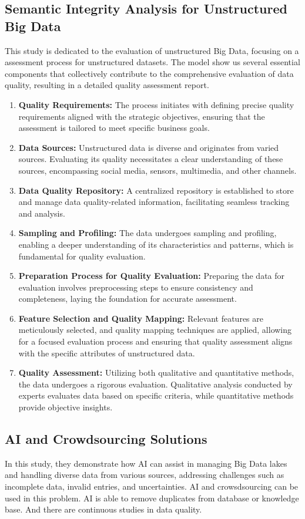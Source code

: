 \documentclass[10pt,a4paper]{article}
\begin{document}
\subsection{Semantic Integrity Analysis for Unstructured Big Data}
This study is dedicated to the evaluation of unstructured Big Data, focusing on a assessment process for unstructured datasets. The model show us several essential components that collectively contribute to the comprehensive evaluation of data quality, resulting in a detailed quality assessment report.
\begin{enumerate}
\item \textbf{Quality Requirements:} The process initiates with defining precise quality requirements aligned with the strategic objectives, ensuring that the assessment is tailored to meet specific business goals.
\item \textbf{Data Sources:} Unstructured data is diverse and originates from varied sources. Evaluating its quality necessitates a clear understanding of these sources, encompassing social media, sensors, multimedia, and other channels.
\item \textbf{Data Quality Repository:} A centralized repository is established to store and manage data quality-related information, facilitating seamless tracking and analysis.
\item \textbf{Sampling and Profiling:} The data undergoes sampling and profiling, enabling a deeper understanding of its characteristics and patterns, which is fundamental for quality evaluation.
\item \textbf{Preparation Process for Quality Evaluation:} Preparing the data for evaluation involves preprocessing steps to ensure consistency and completeness, laying the foundation for accurate assessment.
\item \textbf{Feature Selection and Quality Mapping:} Relevant features are meticulously selected, and quality mapping techniques are applied, allowing for a focused evaluation process and ensuring that quality assessment aligns with the specific attributes of unstructured data.
\item \textbf{Quality Assessment:} Utilizing both qualitative and quantitative methods, the data undergoes a rigorous evaluation. Qualitative analysis conducted by experts evaluates data based on specific criteria, while quantitative methods provide objective insights.
\end{enumerate}
\cite{8605945}
\subsection{AI and Crowdsourcing Solutions}
In this study, they demonstrate how AI can assist in managing Big Data lakes and handling diverse data from various sources, addressing challenges such as incomplete data, invalid entries, and uncertainties.
AI and crowsdsourcing can be used in this problem. AI is able to remove duplicates from database or knowledge base. And there are continuous studies in data quality.\cite{6949519}
\end{document}

